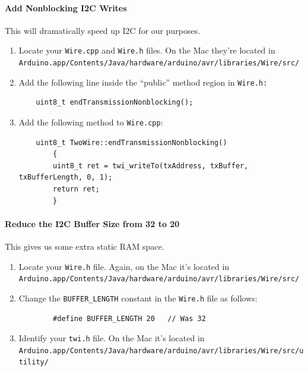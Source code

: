 \documentclass{article}
\begin{document}
\begin{enumerate}
\paragraph{Add Nonblocking I2C Writes}  This will dramatically speed up I2C for our purposes.
\begin{enumerate}
\item Locate your \texttt{Wire.cpp} and \texttt{Wire.h} files.  On the Mac they're located in\\\texttt{Arduino.app/Contents/Java/hardware/arduino/avr/libraries/Wire/src/}

\item Add the following line inside the ``public'' method region in \texttt{Wire.h:}

\begin{verbatim}
    uint8_t endTransmissionNonblocking();
\end{verbatim}

\item Add the following method to \texttt{Wire.cpp}:

\begin{verbatim}
    uint8_t TwoWire::endTransmissionNonblocking()
        {
        uint8_t ret = twi_writeTo(txAddress, txBuffer, txBufferLength, 0, 1);
        return ret;
        }
\end{verbatim}
\end{enumerate}

\paragraph{Reduce the I2C Buffer Size from 32 to 20} This gives us some extra static RAM space.

\begin{enumerate}
\item Locate your \texttt{Wire.h} file.  Again, on the Mac it's located in\\
\texttt{Arduino.app/Contents/Java/hardware/arduino/avr/libraries/Wire/src/}

\item Change the \texttt{BUFFER\_LENGTH} constant in the \texttt{Wire.h} file as follows:

\begin{verbatim}
        #define BUFFER_LENGTH 20   // Was 32
\end{verbatim}

\item Identify your \texttt{twi.h} file.  On the Mac it's located in\\
\texttt{Arduino.app/Contents/Java/hardware/arduino/avr/libraries/Wire/src/utility/}


\end{enumerate}
\end{enumerate}
\end{document}
